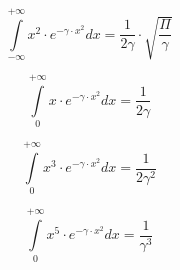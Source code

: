 \documentclass[12pt]{article}
\begin{document}
\begin{equation}
\int\limits_{-\infty}^{+\infty} x^2 \cdot e^{-\gamma \cdot x^2} dx = \frac{1}{2\gamma} \cdot \sqrt{\frac{\Pi}{\gamma}}
\end{equation}

\begin{equation}
\int\limits_{0}^{+\infty} x \cdot e^{-\gamma \cdot x^2} dx = \frac{1}{2\gamma} 
\end{equation}

\begin{equation}
\int\limits_{0}^{+\infty} x^3 \cdot e^{-\gamma \cdot x^2} dx = \frac{1}{2\gamma^2} 
\end{equation}

\begin{equation}
\int\limits_{0}^{+\infty} x^5 \cdot e^{-\gamma \cdot x^2} dx = \frac{1}{\gamma^3} 
\end{equation}
\end{document}
